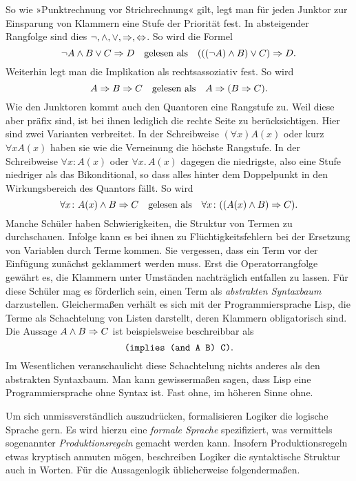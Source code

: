 So wie »Punktrechnung vor Strichrechnung« gilt, legt man für jeden
Junktor zur Einsparung von Klammern eine Stufe der Priorität fest. In
absteigender Rangfolge sind dies ${\lnot}, {\land}, {\lor}, {\Rightarrow},
{\Leftrightarrow}$. So wird die Formel
\[\lnot A\land B\lor C\Rightarrow D\quad\text{gelesen als}\quad
(((\lnot A)\land B)\lor C)\Rightarrow D.\]
Weiterhin legt man die Implikation als rechtsassoziativ fest. So
wird
\[A\Rightarrow B\Rightarrow C\quad\text{gelesen als}\quad A\Rightarrow (B\Rightarrow C).\]
Wie den Junktoren kommt auch den Quantoren eine Rangstufe zu. Weil
diese aber präfix sind, ist bei ihnen lediglich die rechte Seite zu
berücksichtigen. Hier sind zwei Varianten verbreitet. In der
Schreibweise $(\forall x)A(x)$ oder kurz $\forall xA(x)$ haben
sie wie die Verneinung die höchste Rangstufe. In der Schreibweise
$\forall x\colon A(x)$ oder $\forall x.\, A(x)$ dagegen die niedrigste,
also eine Stufe niedriger als das Bikonditional, so dass alles
hinter dem Doppelpunkt in den Wirkungsbereich des Quantors fällt.
So wird
\[\forall x\colon A(x)\land B\Rightarrow C\quad\text{gelesen als}\quad
\forall x\colon ((A(x)\land B)\Rightarrow C).\]
Manche Schüler haben Schwierigkeiten, die Struktur von Termen zu
durchschauen. Infolge kann es bei ihnen zu Flüchtigkeitsfehlern
bei der Ersetzung von Variablen durch Terme kommen. Sie vergessen,
dass ein Term vor der Einfügung zunächst geklammert werden muss.
Erst die Operatorrangfolge gewährt es, die Klammern unter Umständen
nachträglich entfallen zu lassen. Für diese Schüler mag es förderlich
sein, einen Term als \emph{abstrakten Syntaxbaum} darzustellen.
Gleichermaßen verhält es sich mit der Programmiersprache Lisp, die
Terme als Schachtelung von Listen darstellt, deren Klammern
obligatorisch sind.  Die Aussage $A\land B\Rightarrow C$ ist beispielsweise
beschreibbar als
\[\text{\texttt{(implies (and A B) C)}}.\]
Im Wesentlichen veranschaulicht diese Schachtelung
nichts anderes als den abstrakten Syntaxbaum. Man kann gewissermaßen
sagen, dass Lisp eine Programmiersprache ohne Syntax ist. Fast ohne,
im höheren Sinne ohne.

Um sich unmissverständlich auszudrücken, formalisieren Logiker die
logische Sprache gern. Es wird hierzu eine \emph{formale Sprache} spezifiziert,
was vermittels sogenannter \emph{Produktionsregeln} gemacht werden kann.
Insofern Produktionsregeln etwas kryptisch anmuten mögen, beschreiben
Logiker die syntaktische Struktur auch in Worten.
Für die Aussagenlogik üblicherweise folgendermaßen.

